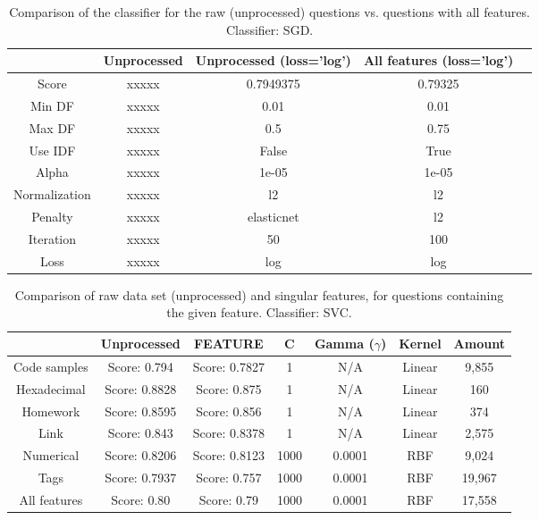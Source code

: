 
\begin{table}[!h]%
	\centering
	\begin{tabular}{| c| c | c | c | c |}
		\hline
		~				& Unprocessed		& Unprocessed (loss='log')	& All features (loss='log')	\\ \hline
		Score 			& xxxxx				& 0.7949375					& 0.79325					\\ \hline
		Min DF 			& xxxxx				& 0.01						& 0.01						\\ \hline
		Max DF 			& xxxxx				& 0.5						& 0.75						\\ \hline
		Use IDF			& xxxxx				& False						& True						\\ \hline
		Alpha 			& xxxxx				& 1e-05						& 1e-05						\\ \hline
		Normalization 	& xxxxx				& l2						& l2						\\ \hline		
		Penalty 		& xxxxx				& elasticnet				& l2						\\ \hline
		Iteration 		& xxxxx				& 50						& 100						\\ \hline
		Loss 			& xxxxx				& log						& log						\\ \hline		
	\end{tabular}
	\caption{Comparison of the classifier for the raw (unprocessed) questions vs. questions with all features. Classifier: SGD.}
	\label{tab:unprocessed_vs_all_feature_detectors_sgd_so}
\end{table}


\begin{table}[!h]%
	\centering
	\begin{tabular}{| c | c | c | c | c | c | c |}
		\hline
		~				& Unprocessed		& FEATURE					& C				& Gamma ($\gamma$)	& Kernel	& Amount	 	\\ \hline
		Code samples 	& Score: 0.794		& Score: 0.7827				& 1				& N/A				& Linear 	& 9,855 		\\ \hline
		Hexadecimal		& Score: 0.8828		& Score: 0.875				& 1				& N/A				& Linear	& 160 			\\ \hline
		Homework 		& Score: 0.8595		& Score: 0.856				& 1				& N/A				& Linear	& 374 			\\ \hline
		Link			& Score: 0.843		& Score: 0.8378				& 1				& N/A				& Linear	& 2,575			\\ \hline		
		Numerical		& Score: 0.8206		& Score: 0.8123				& 1000			& 0.0001			& RBF		& 9,024			\\ \hline
		Tags			& Score: 0.7937		& Score: 0.757				& 1000			& 0.0001			& RBF		& 19,967		\\ \hline
		All features	& Score: 0.80		& Score: 0.79				& 1000 			& 0.0001			& RBF 		& 17,558		\\ \hline
	\end{tabular}
	\caption{Comparison of raw data set (unprocessed) and singular features, for questions containing the given feature. Classifier: SVC.}
	\label{tab:comparison_of_feature_occurences_only}
\end{table}


